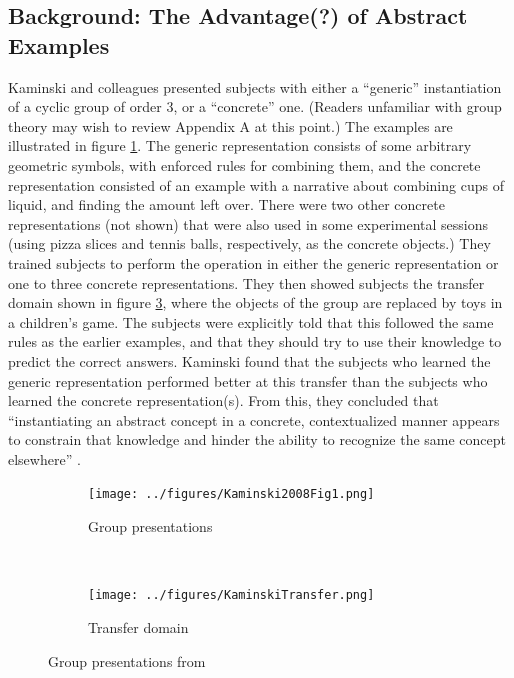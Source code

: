 \documentclass[man,10pt]{apa6}
\begin{document}
\subsection{Background: The Advantage(?) of Abstract Examples}
Kaminski and colleagues \cite{Kaminski2008} presented subjects with either a ``generic'' instantiation of a cyclic group of order 3, or a ``concrete'' one. (Readers unfamiliar with group theory may wish to review Appendix A at this point.) The examples are illustrated in figure \ref{kaminskitraining}. The generic representation consists of some arbitrary geometric symbols, with enforced rules for combining them, and the concrete representation consisted of an example with a narrative about combining cups of liquid, and finding the amount left over. There were two other concrete representations (not shown) that were also used in some experimental sessions (using pizza slices and tennis balls, respectively, as the concrete objects.) They trained subjects to perform the operation in either the generic representation or one to three concrete representations. They then showed subjects the transfer domain shown in figure \ref{kaminskitransfer}, where the objects of the group are replaced by toys in a children's game. The subjects were explicitly told that this followed the same rules as the earlier examples, and that they should try to use their knowledge to predict the correct answers. Kaminski found that the subjects who learned the generic representation performed better at this transfer than the subjects who learned the concrete representation(s). From this, they concluded that ``instantiating an abstract concept in a concrete, contextualized manner appears to constrain that knowledge and hinder the ability to recognize the same concept elsewhere'' \cite{Kaminski2008}. \par
\begin{figure} \centering \begin{subfigure}{0.5\textwidth} \caption{Group presentations} \label{kaminskitraining} \texttt{[image: ../figures/Kaminski2008Fig1.png]} \end{subfigure} \\ \begin{subfigure}{0.5\textwidth} \caption{Transfer domain} \label{kaminskitransfer} \texttt{[image: ../figures/KaminskiTransfer.png]} \end{subfigure} \caption{Group presentations from \cite{Kaminski2008}} \end{figure}\noindent
\end{document}
